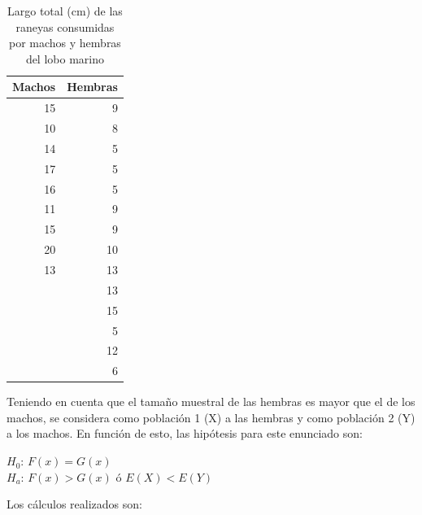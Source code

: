 \documentclass[]{book}
\theoremstyle{definition}
\theoremstyle{definition}
\theoremstyle{definition}
\theoremstyle{remark}
\begin{document}
\begin{table}

\caption{\label{tab:ejemplo-2-datos}Largo total (cm) de las
raneyas consumidas por machos y hembras del lobo marino}
\centering
\begin{tabular}[t]{r|r}
\hline
Machos & Hembras\\
\hline
15 & 9\\
\hline
10 & 8\\
\hline
14 & 5\\
\hline
17 & 5\\
\hline
16 & 5\\
\hline
11 & 9\\
\hline
15 & 9\\
\hline
20 & 10\\
\hline
13 & 13\\
\hline
 & 13\\
\hline
 & 15\\
\hline
 & 5\\
\hline
 & 12\\
\hline
 & 6\\
\hline
\end{tabular}
\end{table}

Teniendo en cuenta que el tamaño muestral de las hembras es mayor que el
de los machos, se considera como población 1 (X) a las hembras y como
población 2 (Y) a los machos. En función de esto, las hipótesis para
este enunciado son:

\(H_0\): \(F(x)=G(x)\)\\
\(H_a\): \(F(x)>G(x)\) ó \(E(X)<E(Y)\)

Los cálculos realizados son:
\end{document}
